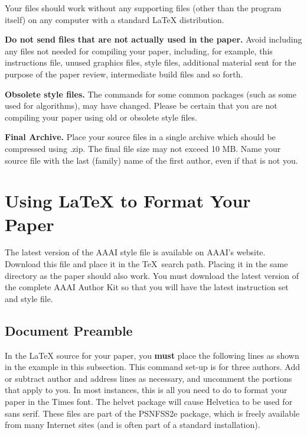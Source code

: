 Your files should work without any supporting files (other than the
program itself) on any computer with a standard {\LaTeX} distribution.

\textbf{Do not send files that are not actually used in the paper.}
Avoid including any files not needed for compiling your paper,
including, for example, this instructions file, unused graphics files,
style files, additional material sent for the purpose of the paper
review, intermediate build files and so forth.

\textbf{Obsolete style files.} The commands for some common packages
(such as some used for algorithms), may have changed. Please be certain
that you are not compiling your paper using old or obsolete style files.

\textbf{Final Archive.} Place your source files in a single archive
which should be compressed using .zip. The final file size may not
exceed 10 MB. Name your source file with the last (family) name of the
first author, even if that is not you.

\section{\texorpdfstring{Using {\LaTeX} to Format Your
Paper}{Using  to Format Your Paper}}\label{using-to-format-your-paper}

The latest version of the AAAI style file is available on AAAI's
website. Download this file and place it in the \TeX~search path.
Placing it in the same directory as the paper should also work. You must
download the latest version of the complete AAAI Author Kit so that you
will have the latest instruction set and style file.

\subsection{Document Preamble}

In the \LaTeX{} source for your paper, you \textbf{must} place the
following lines as shown in the example in this subsection. This command
set-up is for three authors. Add or subtract author and address lines as
necessary, and uncomment the portions that apply to you. In most
instances, this is all you need to do to format your paper in the Times
font. The helvet package will cause Helvetica to be used for sans serif.
These files are part of the PSNFSS2e package, which is freely available
from many Internet sites (and is often part of a standard installation).

